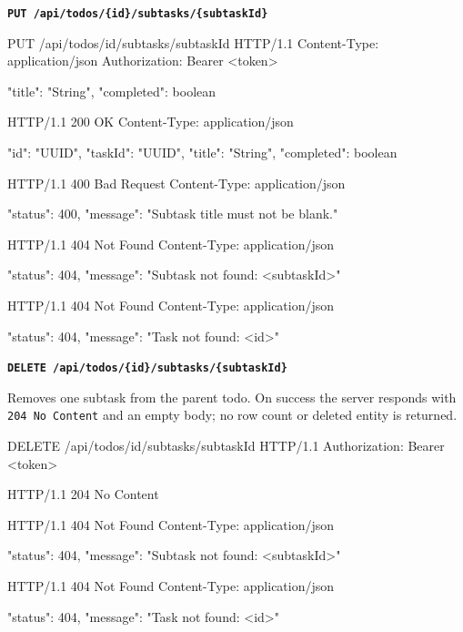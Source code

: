 \newpage


\textbf{\texttt{PUT /api/todos/\{id\}/subtasks/\{subtaskId\}}}

\begin{httpexchange}
\begin{httplisting}
PUT /api/todos/{id}/subtasks/{subtaskId} HTTP/1.1
Content-Type: application/json
Authorization: Bearer <token>

{
    "title": "String",
    "completed": boolean
}
\end{httplisting}
\httpmidarrows
\begin{httplisting}
HTTP/1.1 200 OK
Content-Type: application/json

{
    "id": "UUID",
    "taskId": "UUID",
    "title": "String",
    "completed": boolean
}

HTTP/1.1 400 Bad Request
Content-Type: application/json

{
    "status": 400,
    "message": "Subtask title must not be blank."
}

HTTP/1.1 404 Not Found
Content-Type: application/json

{
    "status": 404,
    "message": "Subtask not found: <subtaskId>"
}

HTTP/1.1 404 Not Found
Content-Type: application/json

{
    "status": 404,
    "message": "Task not found: <id>"
}
\end{httplisting}
\end{httpexchange}


\textbf{\texttt{DELETE /api/todos/\{id\}/subtasks/\{subtaskId\}}}

Removes one subtask from the parent todo. On success the server responds with
\texttt{204 No Content} and an empty body; no row count or deleted entity is returned.

\begin{httpexchange}
\begin{httplisting}
DELETE /api/todos/{id}/subtasks/{subtaskId} HTTP/1.1
Authorization: Bearer <token>
\end{httplisting}
\httpmidarrows
\begin{httplisting}
HTTP/1.1 204 No Content

HTTP/1.1 404 Not Found
Content-Type: application/json

{
    "status": 404,
    "message": "Subtask not found: <subtaskId>"
}

HTTP/1.1 404 Not Found
Content-Type: application/json

{
    "status": 404,
    "message": "Task not found: <id>"
}
\end{httplisting}
\end{httpexchange}

